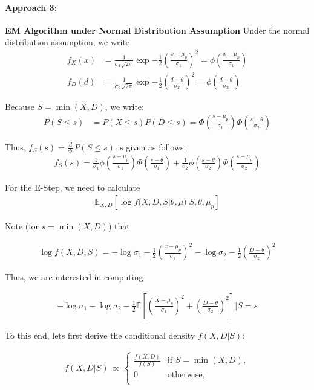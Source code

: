 \documentclass[11pt, oneside]{article}   	%
\theoremstyle{ModifiedStyle}
\begin{document}
\paragraph{Approach 3:} \textbf{EM Algorithm under Normal Distribution Assumption} Under the normal distribution assumption, we write
\begin{align*}
	f_X(x) &= \frac{1}{\sigma_1 \sqrt{2\pi}} \exp{-\frac{1}{2} (\frac{x-\mu_p}{\sigma_1})^2} = \phi(\frac{x-\mu_p}{\sigma_1})\\
	f_D(d) &= \frac{1}{\sigma_2 \sqrt{2\pi}} \exp{-\frac{1}{2} (\frac{d - \theta}{\sigma_2})^2} = \phi(\frac{d-\theta}{\sigma_2})
\end{align*}

Because $S = \min(X,D)$, we write:
\begin{align*}
	P(S \leq s) &= P(X \leq s) P(D \leq s) = \Phi(\frac{s-\mu_p}{\sigma_1}) \Phi(\frac{s-\theta}{\sigma_2})
\end{align*}

Thus, $f_S(s) = \frac{d}{ds} P(S \leq s)$ is given as follows:
\begin{align*}
	f_S(s) = \frac{1}{\sigma_1} \phi(\frac{s-\mu_p}{\sigma_1}) \Phi(\frac{s-\theta}{\sigma_1}) + \frac{1}{\sigma_2}\phi(\frac{s-\theta}{\sigma_2}) \Phi(\frac{s-\mu_p}{\sigma_2})
\end{align*}

For the E-Step, we need to calculate
\begin{align*}
	\mathbb{E}_{X,D}[\log f(X,D,S|\theta,\mu) | S,\theta,\mu_p]
\end{align*}

Note (for $s = \min(X,D)$) that

\begin{align*}
	\log f(X,D,S) = -\log \sigma_1 - \frac{1}{2}(\frac{x-\mu_p}{\sigma_1})^2 - \log \sigma_2 - \frac{1}{2} (\frac{D-\theta}{\sigma_2})^2
\end{align*}

Thus, we are interested in computing

\begin{align*}
	-\log \sigma_1 - \log \sigma_2 - \frac{1}{2} \mathbb{E}[(\frac{X-\mu_p}{\sigma_1})^2 + (\frac{D-\theta}{\sigma_2})^2] | S=s
\end{align*}

To this end, lets first derive the conditional density $f(X,D|S)$:

\begin{align*}
f(X,D|S) \,\propto\, \left \{\!\! \begin{array}{ll}
\frac{f(X,D)}{f(S)} & \text{if } S= \min(X,D), \\
0 & \text{otherwise}, \\
\end{array} \right.
\end{align*}
\end{document}
